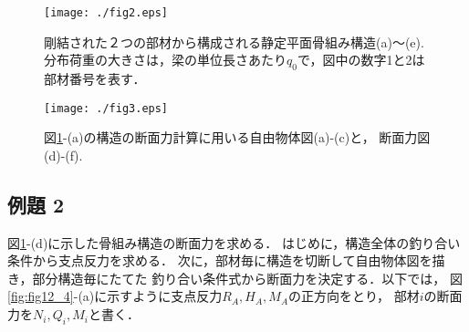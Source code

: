 \documentclass[10pt,a4j]{jbook}
\begin{document}
\begin{figure}[h]
	\begin{center}
	\texttt{[image: ./fig2.eps]} 
	\end{center}
	\caption{
		剛結された２つの部材から構成される静定平面骨組み構造(a)〜(e). 
		分布荷重の大きさは，梁の単位長さあたり$q_0$で，図中の数字1と2は部材番号を表す．
	} 
	\label{fig:fig12_2}
\end{figure}
\begin{figure}[h]
	\begin{center}
	\texttt{[image: ./fig3.eps]} 
	\end{center}
	\caption{
		図\ref{fig:fig12_2}-(a)の構造の断面力計算に用いる自由物体図(a)-(c)と，
		断面力図(d)-(f).
	} 
	\label{fig:fig12_3}
\end{figure}
\subsection{例題 2}
図\ref{fig:fig12_2}-(d)に示した骨組み構造の断面力を求める．
はじめに，構造全体の釣り合い条件から支点反力を求める．
次に，部材毎に構造を切断して自由物体図を描き，部分構造毎にたてた
釣り合い条件式から断面力を決定する．以下では，
図\ref{fig:fig12_4}-(a)に示すように支点反力$R_A,H_A,M_A$の正方向をとり，
部材$i$の断面力を$N_i, Q_i, M_i$と書く．
\end{document}
